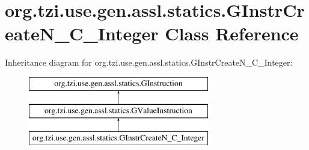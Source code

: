 \hypertarget{classorg_1_1tzi_1_1use_1_1gen_1_1assl_1_1statics_1_1_g_instr_create_n___c___integer}{\section{org.\-tzi.\-use.\-gen.\-assl.\-statics.\-G\-Instr\-Create\-N\-\_\-\-C\-\_\-\-Integer Class Reference}
\label{classorg_1_1tzi_1_1use_1_1gen_1_1assl_1_1statics_1_1_g_instr_create_n___c___integer}
}
Inheritance diagram for org.\-tzi.\-use.\-gen.\-assl.\-statics.\-G\-Instr\-Create\-N\-\_\-\-C\-\_\-\-Integer\-:\begin{figure}[H]
\begin{center}
\leavevmode
\includegraphics[height=3.000000cm]{classorg_1_1tzi_1_1use_1_1gen_1_1assl_1_1statics_1_1_g_instr_create_n___c___integer}
\end{center}
\end{figure}
